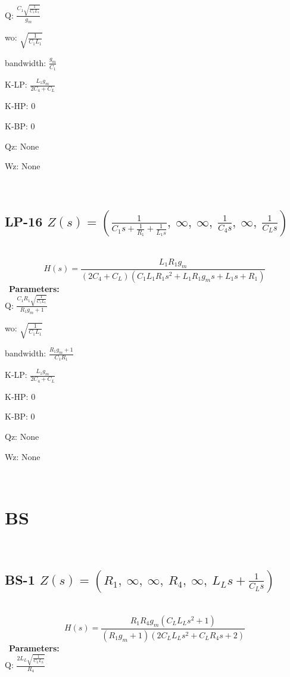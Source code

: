\documentclass{article}
\begin{document}
Q: $\frac{C_{1} \sqrt{\frac{1}{C_{1} L_{1}}}}{g_{m}}$\ 

wo: $\sqrt{\frac{1}{C_{1} L_{1}}}$\ 

bandwidth: $\frac{g_{m}}{C_{1}}$\ 

K-LP: $\frac{L_{1} g_{m}}{2 C_{4} + C_{L}}$\ 

K-HP: $0$\ 

K-BP: $0$\ 

Qz: $\text{None}$\ 

Wz: $\text{None}$\ 

\ 

\subsection{LP-16 $Z(s) = \left( \frac{1}{C_{1} s + \frac{1}{R_{1}} + \frac{1}{L_{1} s}}, \  \infty, \  \infty, \  \frac{1}{C_{4} s}, \  \infty, \  \frac{1}{C_{L} s}\right)$ } \ 
\textbf{\[H(s) = \frac{L_{1} R_{1} g_{m}}{\left(2 C_{4} + C_{L}\right) \left(C_{1} L_{1} R_{1} s^{2} + L_{1} R_{1} g_{m} s + L_{1} s + R_{1}\right)}\] } \ 
\textbf{Parameters:}\\ 

Q: $\frac{C_{1} R_{1} \sqrt{\frac{1}{C_{1} L_{1}}}}{R_{1} g_{m} + 1}$\ 

wo: $\sqrt{\frac{1}{C_{1} L_{1}}}$\ 

bandwidth: $\frac{R_{1} g_{m} + 1}{C_{1} R_{1}}$\ 

K-LP: $\frac{L_{1} g_{m}}{2 C_{4} + C_{L}}$\ 

K-HP: $0$\ 

K-BP: $0$\ 

Qz: $\text{None}$\ 

Wz: $\text{None}$\ 

\ 

\section{BS}\ 
\subsection{BS-1 $Z(s) = \left( R_{1}, \  \infty, \  \infty, \  R_{4}, \  \infty, \  L_{L} s + \frac{1}{C_{L} s}\right)$ } \ 
\textbf{\[H(s) = \frac{R_{1} R_{4} g_{m} \left(C_{L} L_{L} s^{2} + 1\right)}{\left(R_{1} g_{m} + 1\right) \left(2 C_{L} L_{L} s^{2} + C_{L} R_{4} s + 2\right)}\] } \ 
\textbf{Parameters:}\\ 

Q: $\frac{2 L_{L} \sqrt{\frac{1}{C_{L} L_{L}}}}{R_{4}}$\ 
\end{document}
